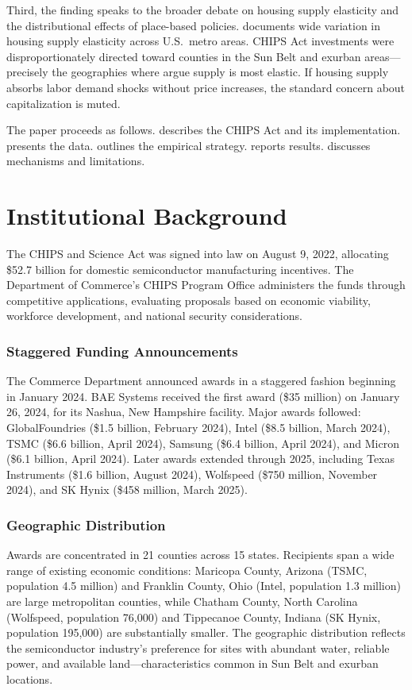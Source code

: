\documentclass[12pt]{article}
\begin{document}
Third, the finding speaks to the broader debate on housing supply elasticity and the distributional effects of place-based policies. \citet{saiz2010geographic} documents wide variation in housing supply elasticity across U.S.\ metro areas. CHIPS Act investments were disproportionately directed toward counties in the Sun Belt and exurban areas---precisely the geographies where \citet{glaeser2005housing} argue supply is most elastic. If housing supply absorbs labor demand shocks without price increases, the standard concern about capitalization is muted.

The paper proceeds as follows.  describes the CHIPS Act and its implementation.  presents the data.  outlines the empirical strategy.  reports results.  discusses mechanisms and limitations.

\section{Institutional Background}
\label{sec:background}

The CHIPS and Science Act was signed into law on August 9, 2022, allocating \$52.7 billion for domestic semiconductor manufacturing incentives. The Department of Commerce's CHIPS Program Office administers the funds through competitive applications, evaluating proposals based on economic viability, workforce development, and national security considerations.

\subsubsection*{Staggered Funding Announcements} The Commerce Department announced awards in a staggered fashion beginning in January 2024. BAE Systems received the first award (\$35 million) on January 26, 2024, for its Nashua, New Hampshire facility. Major awards followed: GlobalFoundries (\$1.5 billion, February 2024), Intel (\$8.5 billion, March 2024), TSMC (\$6.6 billion, April 2024), Samsung (\$6.4 billion, April 2024), and Micron (\$6.1 billion, April 2024). Later awards extended through 2025, including Texas Instruments (\$1.6 billion, August 2024), Wolfspeed (\$750 million, November 2024), and SK Hynix (\$458 million, March 2025).

\subsubsection*{Geographic Distribution} Awards are concentrated in 21 counties across 15 states. Recipients span a wide range of existing economic conditions: Maricopa County, Arizona (TSMC, population 4.5 million) and Franklin County, Ohio (Intel, population 1.3 million) are large metropolitan counties, while Chatham County, North Carolina (Wolfspeed, population 76,000) and Tippecanoe County, Indiana (SK Hynix, population 195,000) are substantially smaller. The geographic distribution reflects the semiconductor industry's preference for sites with abundant water, reliable power, and available land---characteristics common in Sun Belt and exurban locations.
\end{document}

